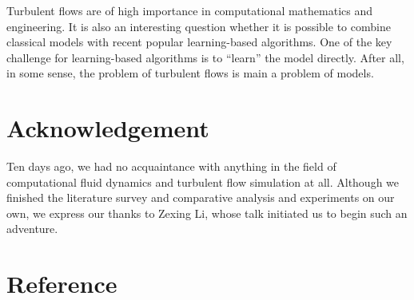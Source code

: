\documentclass[english, nochinese]{pkupaper}
\begin{document}
Turbulent flows are of high importance in computational mathematics and engineering. It is also an interesting question whether it is possible to combine classical models with recent popular learning-based algorithms. One of the key challenge for learning-based algorithms is to ``learn'' the model directly. After all, in some sense, the problem of turbulent flows is main a problem of models.

\section{Acknowledgement} \label{Sec:Ack}

Ten days ago, we had no acquaintance with anything in the field of computational fluid dynamics and turbulent flow simulation at all. Although we finished the literature survey and comparative analysis and experiments on our own, we express our thanks to Zexing Li, whose talk initiated us to begin such an adventure.

\section{Reference}

\printbibliography
\end{document}

